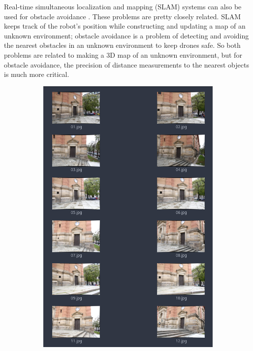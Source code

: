 Real-time simultaneous localization and mapping (SLAM) systems can also be used for obstacle avoidance \cite{Moreno2014}. 
These problems are pretty closely related. 
SLAM keeps track of the robot's position while constructing and updating a map of an unknown environment; obstacle avoidance is a problem of detecting and avoiding the nearest obstacles in an unknown environment to keep drones safe.
So both problems are related to making a 3D map of an unknown environment, but for obstacle avoidance, the precision of distance measurements to the nearest objects is much more critical.

\begin{figure}[h]
    \begin{subfigure}[b]{0.31\textwidth}
      \includegraphics[width=\textwidth]{graphics/input_set.png}

\end{subfigure}
\end{figure}
